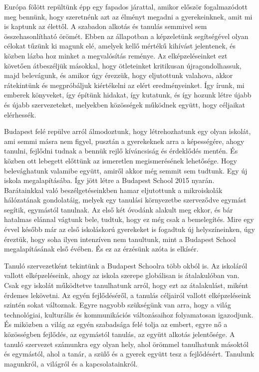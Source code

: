Európa fölött repültünk épp egy fapados járattal, amikor először fogalmazódott meg bennünk, hogy szeretnénk azt az élményt megadni a gyerekeinknek, amit mi is kaptunk az élettől. A szabadon alkotás és tanulás semmivel sem összehasonlítható örömét. Ebben az állapotban a képzeletünk segítségével olyan célokat tűzünk ki magunk elé, amelyek kellő mértékű kihívást jelentenek, és közben lázba hoz minket a megvalósítás reménye. Az elképzeléseinket ezt követően átbeszéljük másokkal, hogy ötleteinket kritikusan újragondolhassuk, majd belevágunk, és amikor úgy érezzük, hogy eljutottunk valahova, akkor rátekintünk és megpróbáljuk kiértékelni az elért eredményeinket. Így írunk, mi emberek könyveket, így építünk hidakat, így kutatunk, és így hozunk létre újabb és újabb szervezeteket, melyekben közösségek működnek együtt, hogy céljaikat elérhessék.

Budapest felé repülve arról álmodoztunk, hogy létrehozhatunk egy olyan iskolát, ami semmi másra nem figyel, pusztán a gyerekeknek arra a képességére, ahogy tanulni, fejlődni tudnak a bennük rejlő kíváncsiság és érdeklődés mentén. És közben ott lebegett előttünk az ismeretlen megismerésének lehetősége. Hogy belevághatunk valamibe együtt, amiről akkor még semmit sem tudtunk. Egy új iskola megalapításába. Így jött létre a Budapest School 2015 nyarán. Barátainkkal való beszélgetéseinkben hamar eljutottunk a mikroiskolák hálózatának gondolatáig, melyek egy tanulási környezetbe szerveződve egymást segítik, egymástól tanulnak. Az első két óvodánk alakult meg ekkor, és bár hatalmas elánnal vágtunk bele, tudtuk, hogy ez még csak a bemelegítés. Mire egy évvel később már az első iskoláskorú gyerekeket is fogadtuk új helyszíneinken, úgy éreztük, hogy soha ilyen intenzíven nem tanultunk, mint a Budapest School megalapításának első évében. És ez az érzésünk azóta is elkísér.

Tanuló szervezetként tekintünk a Budapest Schoolra több okból is. Az iskoláról vallott elképzeléseink, ahogy az iskola szerepe globálisan is átalakulóban van. Csak egy iskolát működtetve tanulhatunk arról, hogy ezt az átalakulást, miként érdemes lekövetni. Az egyén fejlődéséről, a tanulás céljairól vallott elképzeléseink szintén sokat változnak. Egyre nagyobb szükségünk van arra, hogy a világ technológiai, kulturális és kommunikációs változásaihoz folyamatosan igazodjunk. És miközben a világ az egyén szabadsága felé tolja az embert, egyre nő a közösségben fejlődés, az egymástól tanulás, az együtt alkotás jelentősége. A tanuló szervezet számunkra egy olyan hely, ahol örömmel tanulhatunk másoktól és egymástól, ahol a tanár, a szülő és a gyerek együtt tesz a fejlődésért. Tanulunk magunkról, a világról és a kapcsolatainkról.

